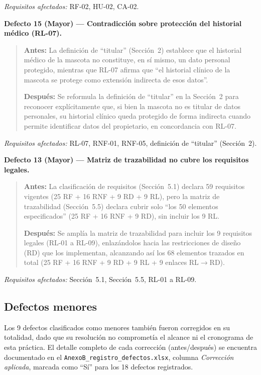 \documentclass[journal,onecolumn]{IEEEtran}
\begin{document}
\textit{Requisitos afectados:} RF-02, HU-02, CA-02.

\vspace{6pt}
\textbf{Defecto 15 (Mayor) --- Contradicción sobre protección del historial médico (RL-07).}

\begin{quote}
	\textbf{Antes:} La definición de ``titular'' (Sección~2) establece que el historial médico de la mascota no constituye, en sí mismo, un dato personal protegido, mientras que RL-07 afirma que ``el historial clínico de la mascota se protege como extensión indirecta de esos datos''.
	
	\textbf{Después:} Se reformula la definición de ``titular'' en la Sección~2 para reconocer explícitamente que, si bien la mascota no es titular de datos personales, su historial clínico queda protegido de forma indirecta cuando permite identificar datos del propietario, en concordancia con RL-07.
\end{quote}

\textit{Requisitos afectados:} RL-07, RNF-01, RNF-05, definición de ``titular'' (Sección~2).

\vspace{6pt}
\textbf{Defecto 13 (Mayor) --- Matriz de trazabilidad no cubre los requisitos legales.}

\begin{quote}
	\textbf{Antes:} La clasificación de requisitos (Sección~5.1) declara 59 requisitos vigentes (25 RF + 16 RNF + 9 RD + 9 RL), pero la matriz de trazabilidad (Sección~5.5) declara cubrir solo ``los 50 elementos especificados'' (25 RF + 16 RNF + 9 RD), sin incluir los 9 RL.
	
	\textbf{Después:} Se amplía la matriz de trazabilidad para incluir los 9 requisitos legales (RL-01 a RL-09), enlazándolos hacia las restricciones de diseño (RD) que los implementan, alcanzando así los 68 elementos trazados en total (25 RF + 16 RNF + 9 RD + 9 RL + 9 enlaces RL$\rightarrow$RD).
\end{quote}

\textit{Requisitos afectados:} Sección~5.1, Sección~5.5, RL-01 a RL-09.

\subsection{Defectos menores}

Los 9 defectos clasificados como menores también fueron corregidos en su totalidad, dado que su resolución no comprometía el alcance ni el cronograma de esta práctica. El detalle completo de cada corrección (antes/después) se encuentra documentado en el \texttt{AnexoB\_registro\_defectos.xlsx}, columna \textit{Corrección aplicada}, marcada como ``Sí'' para los 18 defectos registrados.
\end{document}
